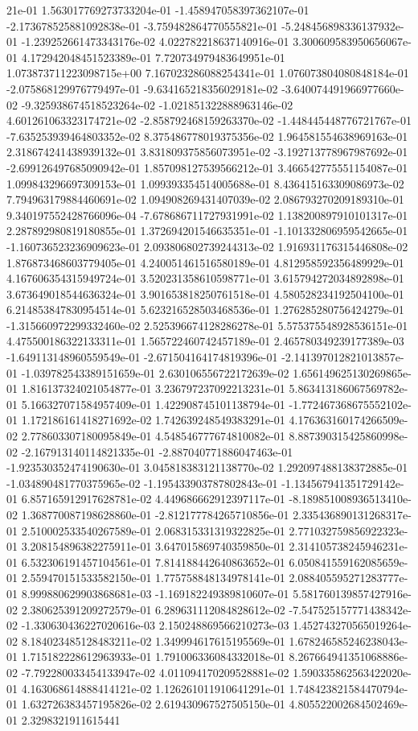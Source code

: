 21e-01	1.563017769273733204e-01	-1.458947058397362107e-01	-2.173678525881092838e-01	-3.759482864770555821e-01	-5.248456898336137932e-01	-1.239252661473343176e-02	4.022782218637140916e-01	3.300609583950656067e-01	4.172942048451523389e-01	7.720734979483649951e-01	1.073873711223098715e+00	7.167023286088254341e-01	1.076073804080848184e-01	-2.075868129976779497e-01	-9.634165218356029181e-02	-3.640074491966977660e-02	-9.325938674518523264e-02	-1.021851322888963146e-02	4.601261063323174721e-02	-2.858792468159263370e-02	-1.448445448776721767e-01	-7.635253939464803352e-02	8.375486778019375356e-02	1.964581554638969163e-01	2.318674241438939132e-01	3.831809375856073951e-02	-3.192713778967987692e-01	-2.699126497685090942e-01	1.857098127539566212e-01	3.466542775551154087e-01	1.099843296697309153e-01	1.099393354514005688e-01	8.436415163309086973e-02	7.794963179884460691e-02	1.094908269431407039e-02	2.086793270209189310e-01	9.340197552428766096e-04	-7.678686711727931991e-02	1.138200897910101317e-01	2.287892980819180855e-01	1.372694201546635351e-01	-1.101332806959542665e-01	-1.160736523236909623e-01	2.093806802739244313e-02	1.916931176315446808e-02	1.876873468603779405e-01	4.240051461516580189e-01	4.812958592356489929e-01	4.167606354315949724e-01	3.520231358610598771e-01	3.615794272034892898e-01	3.673649018544636324e-01	3.901653818250761518e-01	4.580528234192504100e-01	6.214853847830954514e-01	5.623216528503468536e-01	1.276285280756424279e-01	-1.315660972299332460e-02	2.525396674128286278e-01	5.575375548928536151e-01	4.475500186322133311e-01	1.565722460742457189e-01	2.465780349239177389e-03	-1.649113148960559549e-01	-2.671504164174819396e-01	-2.141397012821013857e-01	-1.039782543389151659e-01	2.630106556722172639e-02	1.656149625130269865e-01	1.816137324021054877e-01	3.236797237092213231e-01	5.863413186067569782e-01	5.166327071584957409e-01	1.422908745101138794e-01	-1.772467368675552102e-01	1.172186161418271692e-02	1.742639248549383291e-01	4.176363160174266509e-02	2.778603307180095849e-01	4.548546777674810082e-01	8.887390315425860998e-02	-2.167913140114821335e-01	-2.887040771886047463e-01	-1.923530352474190630e-01	3.045818383121138770e-02	1.292097488138372885e-01	-1.034890481770375965e-02	-1.195433903787802843e-01	-1.134567941351729142e-01	6.857165912917628781e-02	4.449686662912397117e-01	-8.189851008936513410e-02	1.368770087198628860e-01	-2.812177784265710856e-01	2.335436890131268317e-01	2.510002533540267589e-01	2.068315331319322825e-01	2.771032759856922323e-01	3.208154896382275911e-01	3.647015869740359850e-01	2.314105738245946231e-01	6.532306191457104561e-01	7.814188442640863652e-01	6.050841559162085659e-01	2.559470151533582150e-01	1.775758848134978141e-01	2.088405595271283777e-01	8.999880629903868681e-03	-1.169182249389810607e-01	5.581760139857427916e-02	2.380625391209272579e-01	6.289631112084828612e-02	-7.547525157771438342e-02	-1.330630436227020616e-03	2.150248869566210273e-03	1.452743270565019264e-02	8.184023485128483211e-02	1.349994617615195569e-01	1.678246585246238043e-01	1.715182228612963933e-01	1.791006336084332018e-01	8.267664941351068886e-02	-7.792280033454133947e-02	4.011094170209528881e-02	1.590335862563422020e-01	4.163068614888414121e-02	1.126261011910641291e-01	1.748423821584470794e-01	1.632726383457195826e-02	2.619430967527505150e-01	4.805522002684502469e-01	2.3298321911615441